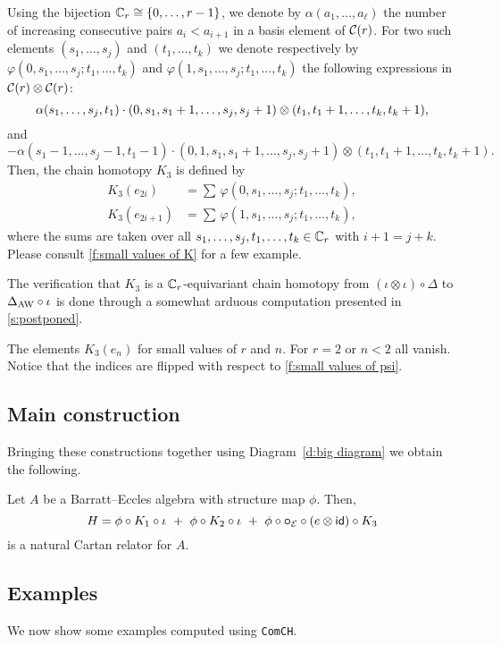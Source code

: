 Using the bijection $\mathbb{C}_r \cong \{0,\dots,r-1\}$, we denote by $\alpha(a_1,\dots,a_\ell)$ the number of increasing consecutive pairs $a_i < a_{i+1}$ in a basis element of $\mathcal{C}(r)$.
For two such elements $(s_1,\dots,s_j)$ and $(t_1,\dots,t_k)$ we denote respectively by $\varphi(0,s_1,\dots,s_j;t_1,\dots,t_k)$ and $\varphi(1,s_1,\dots,s_j;t_1,\dots,t_k)$ the following expressions in $\mathcal{C}(r) \otimes \mathcal{C}(r)$:
\[
\alpha(s_1,\dots,s_j,t_1) \cdot
(0,s_1,s_1+1,\dots,s_j,s_j+1) \otimes
(t_1,t_1+1,\dots,t_k,t_k+1),
\]
and
\[
- \alpha(s_1-1,\dots,s_j-1,t_1-1) \cdot
(0,1,s_1,s_1+1,\dots,s_j,s_j+1)\otimes (t_1,t_1+1,\dots,t_k,t_k+1).
\]
Then, the chain homotopy $K_3$ is defined by
\[
\begin{split}
	K_3(e_{2i})   &= \sum \, \varphi(0,s_1,\dots,s_j;t_1,\dots,t_k), \\
	K_3(e_{2i+1}) &= \sum \, \varphi(1,s_1,\dots,s_j;t_1,\dots,t_k),
\end{split}
\]
where the sums are taken over all $s_1,\dots,s_j,t_1,\dots,t_k \in \mathbb{C}_r$ with $i+1 = j+k$.
Please consult \cref{f:small values of K} for a few example.

The verification that $K_3$ is a $\mathbb{C}_r$-equivariant chain homotopy from $(\iota\otimes \iota)\circ \Delta$ to $\Delta_{\operatorname{AW}}\circ \iota$ is done through a somewhat arduous computation presented in \cref{s:postponed}.

\begin{table}
	\centering
	
	\caption{The elements $K_3(e_n)$ for small values of $r$ and $n$. For $r=2$ or $n<2$ all vanish. Notice that the indices are flipped with respect to \cref{f:small values of psi}.}
	\label{f:small values of K}
\end{table}

\subsection{Main construction}

Bringing these constructions together using Diagram~\eqref{d:big diagram} we obtain the following.

\begin{theorem*}
	Let $A$ be a Barratt--Eccles algebra with structure map $\phi$.
	Then,
	\[
	H = \phi \circ K_1 \circ \iota \ +\ \phi \circ K_2 \circ \iota \ +\ \phi \circ \bcirc_{\BE} \circ (e \ot \id)\circ K_3
	\]
	is a natural Cartan relator for $A$.
\end{theorem*}

\subsection{Examples}

We now show some examples computed using \texttt{ComCH}.
